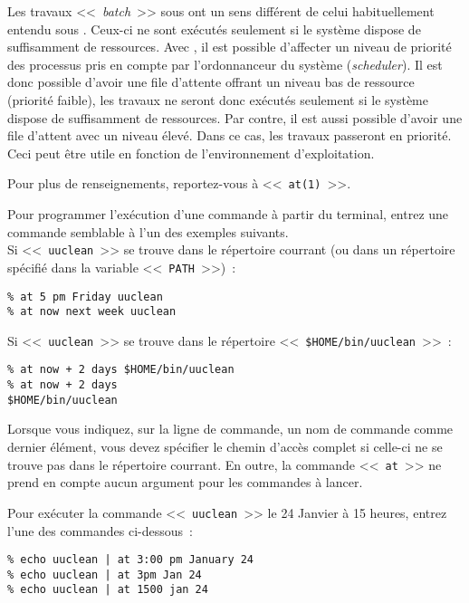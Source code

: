 \begin{remarque}
Les travaux <<~{\sl batch}~>> sous {\Unix} ont un sens diff{\'e}rent de celui
habituellement entendu sous {\OpenVMS}. Ceux-ci ne sont ex{\'e}cut{\'e}s seulement
si le syst{\`e}me dispose de suffisamment de ressources. Avec {\OpenVMS}, il est possible
d'affecter un niveau de priorit{\'e} des processus pris en compte par l'ordonnanceur du
syst{\`e}me ({\sl scheduler}). Il est donc possible d'avoir une file d'attente offrant
un niveau bas de ressource (priorit{\'e} faible), les travaux ne seront donc ex{\'e}cut{\'e}s
seulement si le syst{\`e}me dispose de suffisamment de ressources. Par contre, il est
aussi possible d'avoir une file d'attent avec un niveau {\'e}lev{\'e}. Dans ce cas, les travaux
passeront en priorit{\'e}. Ceci peut {\^e}tre utile en fonction de l'environnement
d'exploitation.
\end{remarque}

Pour plus de renseignements, reportez-vous {\`a} <<~{\tt at(1)}~>>.

\begin{example}
Pour programmer l'ex{\'e}cution d'une commande {\`a} partir du terminal, entrez une commande
semblable {\`a} l'un des exemples suivants.\\
Si <<~{\tt uuclean}~>> se trouve dans le r{\'e}pertoire courrant (ou dans un r{\'e}pertoire sp{\'e}cifi{\'e} dans la
variable <<~{\tt PATH}~>>)~:
\begin{verbatim}
% at 5 pm Friday uuclean
% at now next week uuclean
\end{verbatim}
Si <<~{\tt uuclean}~>> se trouve dans le r{\'e}pertoire <<~\verb=$HOME/bin/uuclean=~>>~:
\begin{verbatim}
% at now + 2 days $HOME/bin/uuclean
% at now + 2 days
$HOME/bin/uuclean
\end{verbatim}
\end{example}

\begin{remarque}
Lorsque vous indiquez, sur la ligne de commande, un nom de commande
comme dernier {\'e}l{\'e}ment, vous devez sp{\'e}cifier le chemin d'acc{\`e}s complet si
celle-ci ne se trouve pas dans le r{\'e}pertoire courrant. En outre, la
commande <<~{\tt at}~>> ne prend en compte aucun argument pour les
commandes {\`a} lancer.
\end{remarque}

\begin{example}
Pour ex{\'e}cuter la commande <<~{\tt uuclean}~>> le 24 Janvier {\`a} 15 heures, entrez l'une des
commandes ci-dessous~:
\begin{verbatim}
% echo uuclean | at 3:00 pm January 24
% echo uuclean | at 3pm Jan 24
% echo uuclean | at 1500 jan 24
\end{verbatim}
\end{example}

